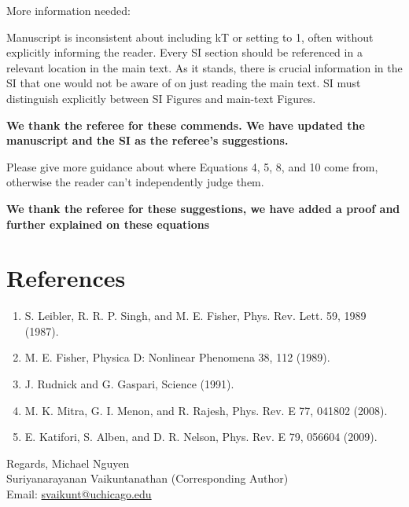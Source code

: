 \documentclass{letter}
\begin{document}
\begin{letter}{}
More information needed: 

Manuscript is inconsistent about including kT or setting to 1, often 
without explicitly informing the reader. 
Every SI section should be referenced in a relevant location in the 
main text. As it stands, there is crucial information in the SI that 
one would not be aware of on just reading the main text. 
SI must distinguish explicitly between SI Figures and main-text 
Figures. 

{\bf
We thank the referee for these commends. We have updated the manuscript and the SI as the referee’s suggestions.}

Please give more guidance about where Equations 4, 5, 8, and 10 come 
from, otherwise the reader can’t independently judge them.

{\bf
We thank the referee for these suggestions, we have added a proof and further explained on these equations}

\section{References}
\begin{enumerate}
\item S. Leibler, R. R. P. Singh, and M. E. Fisher, Phys. Rev. Lett. 59, 1989 (1987). \item M. E. Fisher, Physica D: Nonlinear Phenomena 38, 112 (1989).
\item J. Rudnick and G. Gaspari, Science (1991). 
\item M. K. Mitra, G. I. Menon, and R. Rajesh, Phys. Rev. E 77, 041802 (2008). 
\item E. Katifori, S. Alben, and D. R. Nelson, Phys. Rev. E 79, 056604 (2009).
\end{enumerate}
Regards,
Michael Nguyen\\
Suriyanarayanan Vaikuntanathan (Corresponding Author)   \\
Email: \href{mailto:svaikunt@uchicago.edu}{svaikunt@uchicago.edu}

\end{letter}
\end{document}
